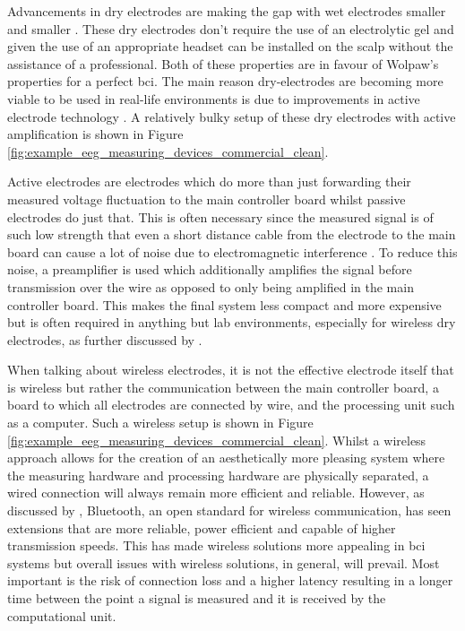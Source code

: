 Advancements in dry electrodes are making the gap with wet electrodes smaller and smaller \citep{wet_vs_dry, dry_electrode_status, wet_dry_comparison_experiment}.
These dry electrodes don't require the use of an electrolytic gel and given the use of an appropriate headset can be installed on the scalp without the assistance of a professional. 
Both of these properties are in favour of Wolpaw's properties for a perfect \gls{bci}.
The main reason dry-electrodes are becoming more viable to be used in real-life environments is due to improvements in active electrode technology \citep{wet_vs_dry}.
A relatively bulky setup of these dry electrodes with active amplification is shown in Figure \ref{fig:example_eeg_measuring_devices_commercial_clean}.

Active electrodes are electrodes which do more than just forwarding their measured voltage fluctuation to the main controller board whilst passive electrodes do just that.
This is often necessary since the measured signal is of such low strength that even a short distance cable from the electrode to the main board can cause a lot of noise due to electromagnetic interference \citep{active_electrode_explained}.
To reduce this noise, a preamplifier is used which additionally amplifies the signal before transmission over the wire as opposed to only being amplified in the main controller board.
This makes the final system less compact and more expensive but is often required in anything but lab environments, especially for wireless dry electrodes, as further discussed by \citet{wet_vs_dry}.

When talking about wireless electrodes, it is not the effective electrode itself that is wireless but rather the communication between the main controller board, a board to which all electrodes are connected by wire, and the processing unit such as a computer.
Such a wireless setup is shown in Figure \ref{fig:example_eeg_measuring_devices_commercial_clean}.
Whilst a wireless approach allows for the creation of an aesthetically more pleasing system where the measuring hardware and processing hardware are physically separated, a wired connection will always remain more efficient and reliable. 
However, as discussed by \citet{bluetooth_evaluation}, Bluetooth, an open standard for wireless communication, has seen extensions that are more reliable, power efficient and capable of higher transmission speeds.
This has made wireless solutions more appealing in \gls{bci} systems but overall issues with wireless solutions, in general, will prevail.
Most important is the risk of connection loss and a higher latency resulting in a longer time between the point a signal is measured and it is received by the computational unit.

